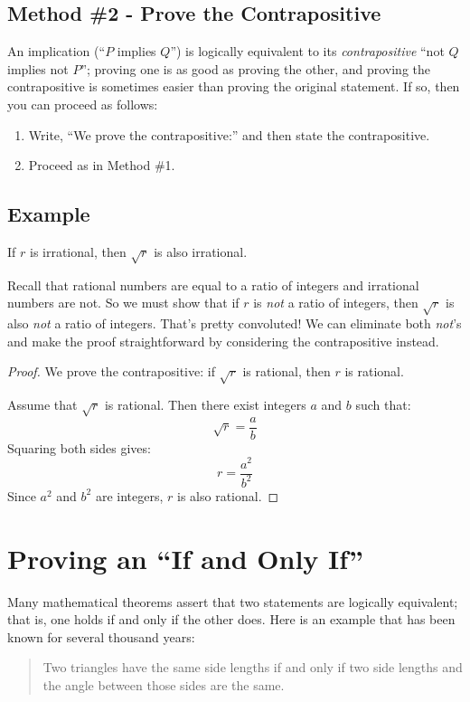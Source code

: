 \subsection{Method \#2 - Prove the Contrapositive}

An implication (``$P$ implies $Q$'') is logically equivalent to its
\emph{contrapositive} ``not $Q$ implies not $P$''; proving one is as good
as proving the other, and proving the contrapositive is sometimes easier
than proving the original statement.  If so, then you can proceed as
follows:
%
\begin{enumerate}
\item Write, ``We prove the contrapositive:'' and then state the
contrapositive.
\item Proceed as in Method \#1.
\end{enumerate}

\subsection*{Example}

\begin{theorem}
If $r$ is irrational, then $\sqrt{r}$ is also irrational.
\end{theorem}

Recall that rational numbers are equal to a ratio of integers and
irrational numbers are not.  So we must show that if $r$ is \textit{not} a
ratio of integers, then $\sqrt{r}$ is also \textit{not} a ratio of
integers.  That's pretty convoluted!  We can eliminate both \emph{not}'s
and make the proof straightforward by considering the contrapositive
instead.

\begin{proof}
We prove the contrapositive: if $\sqrt{r}$ is rational, then $r$ is
rational.

Assume that $\sqrt{r}$ is rational.  Then there exist integers $a$ and $b$
such that:
%
\[
\sqrt{r} = \frac{a}{b}
\]
%
Squaring both sides gives:
%
\[
r  = \frac{a^2}{b^2}
\]
%
Since $a^2$ and $b^2$ are integers, $r$ is also rational.
\end{proof}


\section{Proving an ``If and Only If''}
\label{sec:prove_iff}

Many mathematical theorems assert that two statements are logically
equivalent; that is, one holds if and only if the other does.  Here is an
example that has been known for several thousand years:
\begin{quote}
Two triangles have the same side lengths if and only if two
side lengths and the angle between those sides are the same.
\end{quote}

